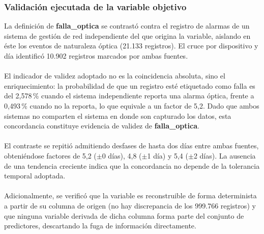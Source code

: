 \documentclass[12pt,a4paper]{article}
\begin{document}
\subsubsection{Validación ejecutada de la variable objetivo}
La definición de \textbf{falla\_optica} se contrastó contra el registro de
alarmas de un sistema de gestión de red independiente del que origina la
variable, aislando en éste los eventos de naturaleza óptica (21.133 registros).
El cruce por dispositivo y día identificó 10.902 registros marcados por ambas
fuentes.\\\\

\noindent
El indicador de validez adoptado no es la coincidencia absoluta, sino el
enriquecimiento: la probabilidad de que un registro esté etiquetado como falla
es del 2,578\,\% cuando el sistema independiente reporta una alarma óptica,
frente a 0,493\,\% cuando no la reporta, lo que equivale a un factor de 5,2.
Dado que ambos sistemas no comparten el sistema en donde son capturado los datos, esta concordancia
constituye evidencia de validez de \textbf{falla\_optica}.\\\\

\noindent
El contraste se repitió admitiendo desfases de hasta dos días entre ambas
fuentes, obteniéndose factores de 5,2 ($\pm$0 días), 4,8 ($\pm$1 día) y 5,4
($\pm$2 días). La ausencia de una tendencia creciente indica que la
concordancia no depende de la tolerancia temporal adoptada.\\\\

\noindent
Adicionalmente, se verificó que la variable es reconstruible de forma
determinista a partir de su columna de origen (no hay discrepancia de los
999.766 registros) y que ninguna variable derivada de dicha columna forma parte
del conjunto de predictores, descartando la fuga de información directamente.
\end{document}
